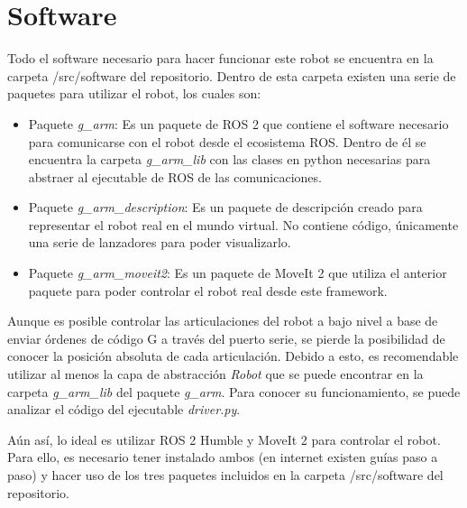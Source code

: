 \section*{Software}
\noindent Todo el software necesario para hacer funcionar este robot se encuentra en la carpeta /src/software del repositorio. Dentro de 
esta carpeta existen una serie de paquetes para utilizar el robot, los cuales son:
\begin{itemize}
\item Paquete \textit{g\_arm}: Es un paquete de ROS 2 que contiene el software necesario para comunicarse con el robot desde el 
ecosistema ROS. Dentro de él se encuentra la carpeta \textit{g\_arm\_lib} con las clases en python necesarias para abstraer al 
ejecutable de ROS de las comunicaciones.
\item Paquete \textit{g\_arm\_description}: Es un paquete de descripción creado para representar el robot real en el mundo virtual. No contiene código, únicamente una serie de lanzadores para poder visualizarlo.
\item Paquete \textit{g\_arm\_moveit2}: Es un paquete de MoveIt 2 que utiliza el anterior paquete para poder controlar el robot 
real desde este framework.
\end{itemize}

Aunque es posible controlar las articulaciones del robot a bajo nivel a base de enviar órdenes de código G a través del puerto serie, se pierde la 
posibilidad de conocer la posición absoluta 
de cada articulación. Debido a esto, es recomendable utilizar al menos la capa de abstracción \textit{Robot} que se puede encontrar en 
la carpeta \textit{g\_arm\_lib} del paquete \textit{g\_arm}. Para conocer su funcionamiento, se puede analizar el código del ejecutable 
\textit{driver.py}. 

Aún así, lo ideal es utilizar ROS 2 Humble y MoveIt 2 para controlar el robot. Para ello, es necesario tener instalado 
ambos (en internet existen guías paso a paso) y hacer uso de los tres paquetes incluidos en la carpeta /src/software del repositorio. 


